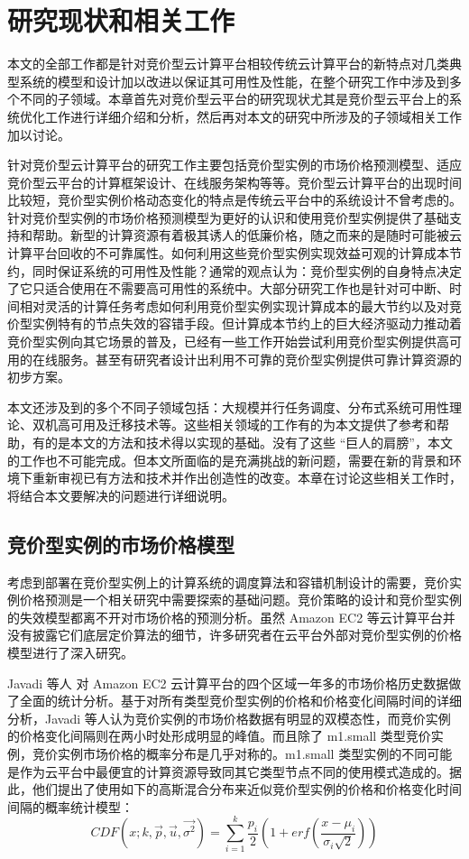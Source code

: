 \chapter{研究现状和相关工作}
\label{cha:background}

本文的全部工作都是针对竞价型云计算平台相较传统云计算平台的新特点对几类典型系统的模型和设计加以改进以保证其可用性及性能，在整个研究工作中涉及到多个不同的子领域。本章首先对竞价型云平台的研究现状尤其是竞价型云平台上的系统优化工作进行详细介绍和分析，然后再对本文的研究中所涉及的子领域相关工作加以讨论。

针对竞价型云计算平台的研究工作主要包括竞价型实例的市场价格预测模型、适应竞价型云平台的计算框架设计、在线服务架构等等。竞价型云计算平台的出现时间比较短，竞价型实例价格动态变化的特点是传统云平台中的系统设计不曾考虑的。针对竞价型实例的市场价格预测模型为更好的认识和使用竞价型实例提供了基础支持和帮助。新型的计算资源有着极其诱人的低廉价格，随之而来的是随时可能被云计算平台回收的不可靠属性。如何利用这些竞价型实例实现效益可观的计算成本节约，同时保证系统的可用性及性能？通常的观点认为：竞价型实例的自身特点决定了它只适合使用在不需要高可用性的系统中。大部分研究工作也是针对可中断、时间相对灵活的计算任务考虑如何利用竞价型实例实现计算成本的最大节约以及对竞价型实例特有的节点失效的容错手段。但计算成本节约上的巨大经济驱动力推动着竞价型实例向其它场景的普及，已经有一些工作开始尝试利用竞价型实例提供高可用的在线服务。甚至有研究者设计出利用不可靠的竞价型实例提供可靠计算资源的初步方案。

本文还涉及到的多个不同子领域包括：大规模并行任务调度、分布式系统可用性理论、双机高可用及迁移技术等。这些相关领域的工作有的为本文提供了参考和帮助，有的是本文的方法和技术得以实现的基础。没有了这些 ``巨人的肩膀''，本文的工作也不可能完成。但本文所面临的是充满挑战的新问题，需要在新的背景和环境下重新审视已有方法和技术并作出创造性的改变。本章在讨论这些相关工作时，将结合本文要解决的问题进行详细说明。

\section{竞价型实例的市场价格模型}
考虑到部署在竞价型实例上的计算系统的调度算法和容错机制设计的需要，竞价实例价格预测是一个相关研究中需要探索的基础问题。竞价策略的设计和竞价型实例的失效模型都离不开对市场价格的预测分析。虽然 Amazon EC2 等云计算平台并没有披露它们底层定价算法的细节，许多研究者在云平台外部对竞价型实例的价格模型进行了深入研究。

Javadi 等人 \cite{Javadi:2011:SMS:2120969.2121740} 对 Amazon EC2 云计算平台的四个区域一年多的市场价格历史数据做了全面的统计分析。基于对所有类型竞价型实例的价格和价格变化间隔时间的详细分析，Javadi 等人认为竞价实例的市场价格数据有明显的双模态性，而竞价实例的价格变化间隔则在两小时处形成明显的峰值。而且除了 m1.small 类型竞价实例，竞价实例市场价格的概率分布是几乎对称的。m1.small 类型实例的不同可能是作为云平台中最便宜的计算资源导致同其它类型节点不同的使用模式造成的。据此，他们提出了使用如下的高斯混合分布来近似竞价型实例的价格和价格变化时间间隔的概率统计模型：
\begin{equation}\label{eq_mog}\nonumber 
CDF(x; k, \vec p, \vec u, \vec{\sigma^2}) = \sum_{i=1}^{k}{\frac{p_i}{2}(1+erf(\frac{x-\mu_i}{\sigma_i\sqrt{2}}))}
\end{equation}

